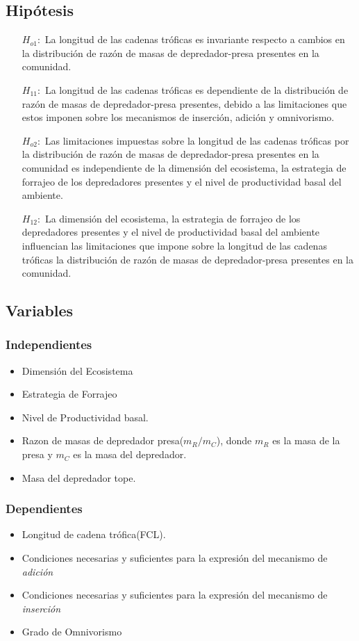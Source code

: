 \documentclass[a4paper,12pt]{article}
\begin{document}
\subsection{Hip\'otesis}
\begin{itemize}
\item[$H_{o1}:$] La longitud de las cadenas tr\'oficas es invariante respecto a cambios en la distribuci\'on de raz\'on de masas de depredador-presa presentes en la comunidad.
\item[$H_{11}:$] La longitud de las cadenas tr\'oficas es dependiente de la distribuci\'on de raz\'on de masas de depredador-presa presentes, debido a las limitaciones que estos imponen sobre los mecanismos de inserci\'on, adici\'on y omnivorismo.
\item[$H_{o2}:$] Las limitaciones impuestas sobre la longitud de las cadenas tr\'oficas por la distribuci\'on de raz\'on de masas de depredador-presa presentes en la comunidad es independiente de la dimensi\'on del ecosistema, la estrategia de forrajeo de los depredadores presentes y el nivel de productividad basal del ambiente.
\item[$H_{12}:$] La dimensi\'on del ecosistema, la estrategia de forrajeo de los depredadores presentes y el nivel de productividad basal del ambiente influencian las limitaciones que impone sobre la longitud de las cadenas tr\'oficas la distribuci\'on de raz\'on de masas de depredador-presa presentes en la comunidad.
\end{itemize}
\subsection{Variables}
\subsubsection{Independientes}
\begin{itemize}
\item Dimensi\'on del Ecosistema
\item Estrategia de Forrajeo
\item Nivel de Productividad basal.
\item Razon de masas de depredador presa($m_R/m_C$), donde $m_R$ es la masa de la presa y $m_C$ es la masa del depredador.
\item Masa del depredador tope.
\end{itemize}
\subsubsection{Dependientes}
\begin{itemize}
\item Longitud de cadena tr\'ofica(FCL).
\item Condiciones necesarias y suficientes para la expresi\'on del mecanismo de \textit{adici\'on}
\item Condiciones necesarias y suficientes para la expresi\'on del mecanismo de \textit{inserci\'on}
\item Grado de Omnivorismo

\end{itemize}
\end{document}
